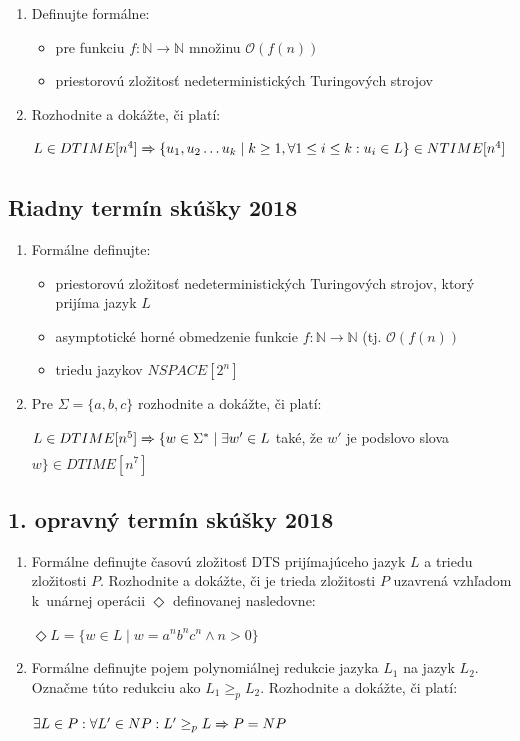\documentclass[11pt,a4paper]{article}
\begin{document}
		\begin{enumerate}
			\item Definujte formálne:

			\begin{itemize}
				\item pre funkciu $f: \mathbb{N} \rightarrow \mathbb{N}$ množinu $\mathcal{O}(f(n))$
				\item priestorovú zložitosť nedeterministických Turingových strojov
			\end{itemize}

			\item Rozhodnite a dokážte, či platí:
	
			$L \in DTIME[n^4] \xRightarrow[]{} \{ u_1, u_2 \ldots u_k \mid k \geq 1, \forall 1 \leq i \leq k: u_i \in L\} \in NTIME[n^4]$
		\end{enumerate}	

		\subsection{Riadny termín skúšky 2018}

		\begin{enumerate}
			\item Formálne definujte:

			\begin{itemize}
				\item priestorovú zložitosť nedeterministických Turingových strojov, ktorý prijíma jazyk $L$
				\item asymptotické horné obmedzenie funkcie $f: \mathbb{N} \rightarrow \mathbb{N}$ (tj. $\mathcal{O}(f(n))$
				\item triedu jazykov $NSPACE[2^n]$
			\end{itemize}

			\item Pre $\Sigma = \{a,b,c\}$ rozhodnite a dokážte, či platí:
	
			$L \in DTIME[n^5] \xRightarrow[]{} \{ w \in \Sigma^* \mid \exists w' \in L$ také, že $w'$ je podslovo slova $w\} \in DTIME[n^7]$
		\end{enumerate}	
	
		\subsection{1. opravný termín skúšky 2018}
		
		\begin{enumerate}
			\item Formálne definujte časovú zložitosť DTS prijímajúceho jazyk $L$ a triedu zložitosti $P$. Rozhodnite a dokážte, či je trieda zložitosti $P$ uzavrená vzhľadom k~unárnej operácii $\Diamond$ definovanej nasledovne:
			
			$\Diamond L = \{w \in L \mid w = a^nb^nc^n \land n > 0\}$
			
			\item Formálne definujte pojem polynomiálnej redukcie jazyka $L_1$ na jazyk $L_2$. Označme túto redukciu ako $L_1 \geq_p L_2$. Rozhodnite a dokážte, či platí:
			
			$\exists L \in P: \forall L' \in NP: L' \geq_p L \xRightarrow[]{} P = NP$
		\end{enumerate}
\end{document}
